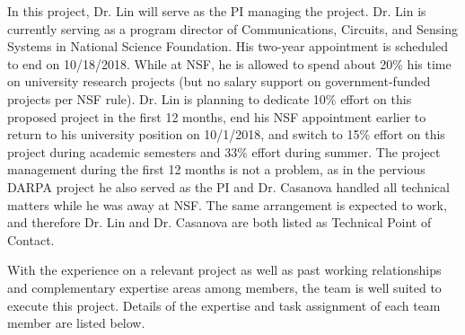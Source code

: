 In this project, Dr. Lin will serve as the PI managing the project. Dr. Lin is currently serving as a program director of Communications, Circuits, and Sensing Systems in National Science Foundation. His two-year appointment is scheduled to end on 10/18/2018. While at NSF, he is allowed to spend about 20\% his time on university research projects (but no salary support on government-funded projects per NSF rule). Dr. Lin is planning to dedicate 10\% effort on this proposed project in the first 12 months, end his NSF appointment earlier to return to his university position on 10/1/2018, and switch to 15\% effort on this project during academic semesters and 33\% effort during summer. The project management during the first 12 months is not a problem, as in the pervious DARPA project he also served as the PI and Dr. Casanova handled all technical matters while he was away at NSF. The same arrangement is expected to work, and therefore Dr. Lin and Dr. Casanova are both listed as Technical Point of Contact. 

With the experience on a relevant project as well as past working relationships and complementary expertise areas among members, the team is well suited to execute this project. Details of the expertise and task assignment of each team member are listed below. 

